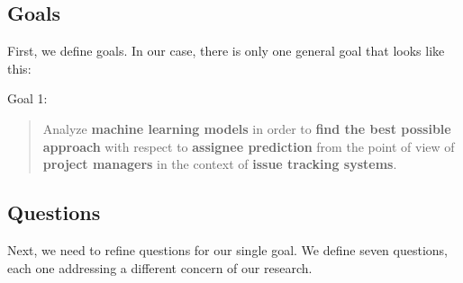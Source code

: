 \subsection{Goals}

First, we define goals. In our case, there is only one general goal that looks like this:

\begin{framed}
  \hypertarget{goal:1}{Goal 1:}
  \begin{quote}
    Analyze \textbf{machine learning models} in order to \textbf{find the best possible approach} with respect to \textbf{assignee prediction} from the point of view of \textbf{project managers} in the context of \textbf{issue tracking systems}.
  \end{quote}
\end{framed}

\subsection{Questions}

Next, we need to refine questions for our single goal. We define seven questions, each one addressing a different concern of our research.

